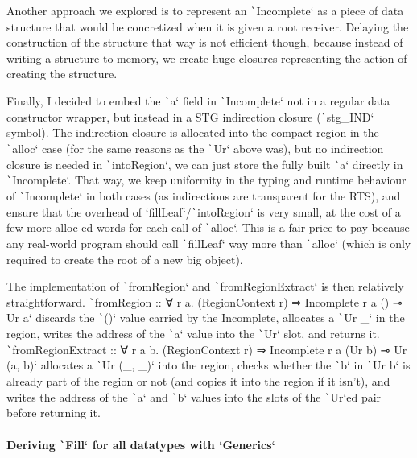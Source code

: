 \documentclass[english]{jflart}
\begin{document}
Another approach we explored is to represent an \texttt`Incomplete` as a piece of data structure that would be concretized when it is given a root receiver. Delaying the construction of the structure that way is not efficient though, because instead of writing a structure to memory, we create huge closures representing the action of creating the structure.

Finally, I decided to embed the \texttt`a` field in \texttt`Incomplete` not in a regular data constructor wrapper, but instead in a STG indirection closure (\texttt`stg_IND` symbol). The indirection closure is allocated into the compact region in the \texttt`alloc` case (for the same reasons as the \texttt`Ur` above was), but no indirection closure is needed in \texttt`intoRegion`, we can just store the fully built \texttt`a` directly in \texttt`Incomplete`. That way, we keep uniformity in the typing and runtime behaviour of \texttt`Incomplete` in both cases (as indirections are transparent for the RTS), and ensure that the overhead of `fillLeaf`/\texttt`intoRegion` is very small, at the cost of a few more alloc-ed words for each call of \texttt`alloc`. This is a fair price to pay because any real-world program should call \texttt`fillLeaf` way more than \texttt`alloc` (which is only required to create the root of a new big object).

The implementation of \texttt`fromRegion` and \texttt`fromRegionExtract` is then relatively straightforward. \texttt`fromRegion :: ∀ r a. (RegionContext r) ⇒ Incomplete r a () ⊸ Ur a` discards the \texttt`()` value carried by the Incomplete, allocates a \texttt`Ur _` in the region, writes the address of the \texttt`a` value into the \texttt`Ur` slot, and returns it. \texttt`fromRegionExtract :: ∀ r a b. (RegionContext r) ⇒ Incomplete r a (Ur b) ⊸ Ur (a, b)` allocates a \texttt`Ur (_, _)` into the region, checks whether the \texttt`b` in \texttt`Ur b` is already part of the region or not (and copies it into the region if it isn't), and writes the address of the \texttt`a` and \texttt`b` values into the slots of the \texttt`Ur`ed pair before returning it.

\paragraph{Deriving \texttt`Fill` for all datatypes with `Generics`}
\end{document}
